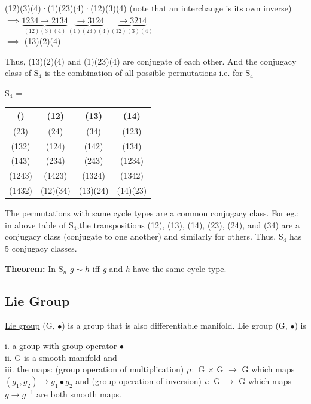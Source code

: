 (12)(3)(4)·(1)(23)(4)·(12)(3)(4) (note that an interchange is its own inverse)  \\
$\implies \underbrace{1234 \rightarrow 2134}_{(12)(3)(4)} \underbrace{ \rightarrow 3124}_{(1)(23)(4)}  \underbrace{ \rightarrow 3214}_{(12)(3)(4)}$ \\ 
$\implies$ (13)(2)(4)

Thus, (13)(2)(4) and (1)(23)(4) are conjugate of each other.
And the conjugacy class of S$_4$ is the combination of all possible permutations i.e. for S$_4$
\begin{center}
    S$_4$ = 
    \begin{tabular}{ |c|c|c|c| } 
     \hline
     () & (12) & (13) & (14)\\ \hline
     (23) & (24) & (34) & (123)\\ \hline
     (132) & (124) & (142) & (134)\\ \hline
     (143) & (234) & (243) & (1234)\\ \hline
     (1243) & (1423) & (1324) & (1342)\\ \hline
     (1432) & (12)(34) & (13)(24) & (14)(23) \\
     \hline
    \end{tabular}
\end{center}

The permutations with same cycle types are a common conjugacy class. 
For eg.: in above table of S$_4$,the transpositions (12), (13), (14), (23), (24), and (34) are a conjugacy class (conjugate to one another) and similarly for others.
Thus, S$_4$ has 5 conjugacy classes.

\textbf{Theorem: } In S$_n$ $g \sim h$ iff \textit{g} and \textit{h} have the same cycle type.

\subsection{Lie Group}
\href{https://aimath.org/E8/liegroup.html#:~:text=Lie%20groups%20lie%20at%20the,are%20examples%20of%20smooth%20manifolds.}{Lie group}
(G, $\bullet$) is a group that is also differentiable manifold. Lie group (G, $\bullet$) is

i. a group with group operator $\bullet$ \\
ii. G is a smooth manifold and \\
iii. the maps: (group operation of multiplication) $\mu :$ G $\times$ G $\rightarrow$ G which maps $(g_1, g_2) \rightarrow g_1\bullet g_2$ and
(group operation of inversion) $i :$ G $\rightarrow$ G which maps $g \rightarrow g^{-1}$ are both smooth maps.

